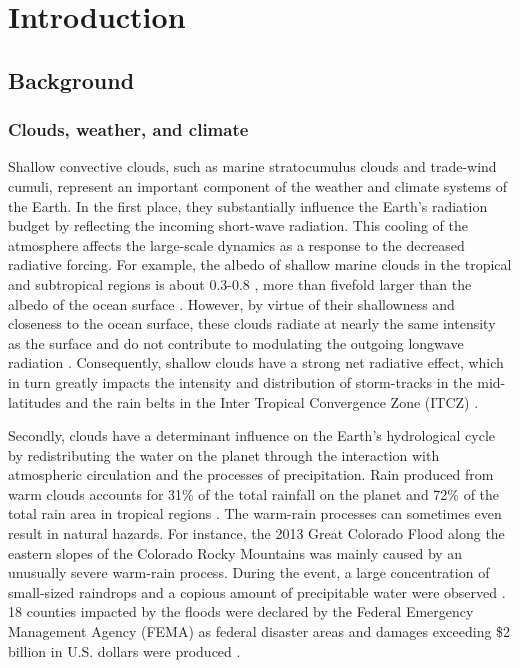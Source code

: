 \resetdatestamp

\chapter{Introduction}


\section{Background}



\subsection{Clouds, weather, and climate}
	
Shallow convective clouds, such as marine stratocumulus clouds and trade-wind cumuli, represent an important component of the weather and climate systems of the Earth. In the first place, they substantially influence the Earth's radiation budget by reflecting the incoming short-wave radiation. This cooling of the atmosphere affects the large-scale dynamics as a response to the decreased radiative forcing. For example, the albedo of shallow marine clouds in the tropical and subtropical regions is about 0.3-0.8 \citep{ Chen2012, Painemal2012}, more than fivefold larger than the albedo of the ocean surface \citep [$\approx$ 0.06-0.1,] []{Payne1972}. However, by virtue of their shallowness and closeness to the ocean surface, these clouds radiate at nearly the same intensity as the surface and do not contribute to modulating the outgoing longwave radiation \citep{Stevens2009}. Consequently, shallow clouds have a strong net radiative effect, which in turn greatly impacts the intensity and distribution of storm-tracks in the mid-latitudes \citep{Wang2014} and the rain belts in the Inter Tropical Convergence Zone (ITCZ) \citep{Voigt2016}.

Secondly, clouds have a determinant influence on the Earth's hydrological cycle by redistributing the water on the planet through the interaction with atmospheric circulation and the processes of precipitation. Rain produced from warm clouds accounts for 31\% of the total rainfall on the planet and 72\% of the total rain area in tropical regions \citep{Lau2003}. The warm-rain processes can sometimes even result in natural hazards. For instance, the 2013 Great Colorado Flood along the eastern slopes of the Colorado Rocky Mountains was mainly caused by an unusually severe warm-rain process. During the event, a large concentration of small-sized raindrops and a copious amount of precipitable water were observed \citep{Friedrich2016}. 18 counties impacted by the floods were declared by the Federal Emergency Management Agency (FEMA) as federal disaster areas and damages exceeding \$2 billion in U.S. dollars were produced \citep{Gochis2013}. 

